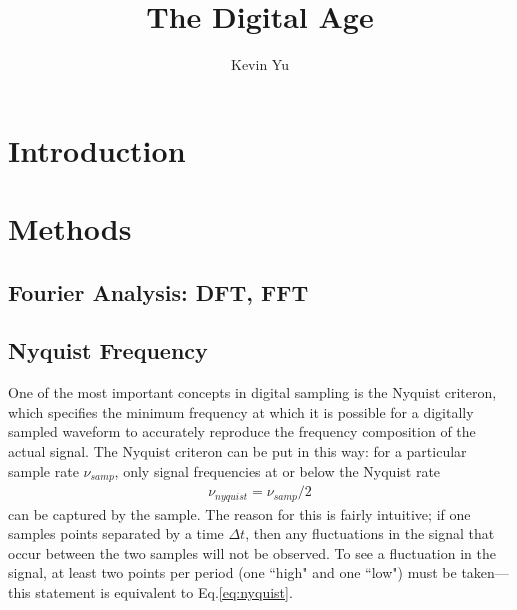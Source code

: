 \documentclass[12pt]{article}
\title{The Digital Age}
\author {
Kevin Yu
}
\begin{document}
\maketitle

\begin{abstract}
\end{abstract}

\section*{Introduction}

\section*{Methods}

\subsection*{Fourier Analysis: DFT, FFT}


\subsection*{Nyquist Frequency}
One of the most important concepts in digital sampling is the Nyquist criteron, which specifies the minimum frequency at which it is possible for a digitally sampled waveform to accurately reproduce the frequency composition of the actual signal. The Nyquist criteron can be put in this way: for a particular sample rate $\nu_{samp}$, only signal frequencies at or below the Nyquist rate
\begin{eqnarray}
 \nu_{nyquist} = \nu_{samp} / 2 \label{eq:nyquist}
\end{eqnarray}
can be captured by the sample. The reason for this is fairly intuitive; if one samples points separated by a time $\Delta{t}$, then any fluctuations in the signal that occur between the two samples will not be observed. To see a fluctuation in the signal, at least two points per period (one ``high" and one ``low") must be taken---this statement is equivalent to Eq.\ref{eq:nyquist}.
\end{document}
